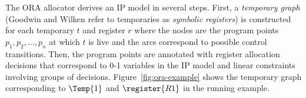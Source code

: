 \documentclass[acmsmall,authorversion,nonacm]{acmart}
\newcommand{\noMathVar}[2]{\operatorname{#1}(#2)}
\begin{document}
The ORA allocator derives an IP model in several steps.
First, a \emph{temporary graph} (Goodwin and Wilken refer to
temporaries as \emph{symbolic registers}) is constructed for each
temporary $t$ and register $r$ where the nodes are the program points
$p_1, p_2, \ldots, p_n$ at which $t$ is live and the arcs correspond
to possible control transitions.
Then, the program points are annotated with register allocation
decisions that correspond to \mbox{0-1} variables in the IP model and
linear constraints involving groups of decisions.
Figure~\ref{fig:ora-example} shows the temporary graph corresponding
to $\Temp{1}$ and $\register{R1}$ in the running example.

\newcommand{\defvar}[1]{\noMathVar{def}{\Temp{1},\register{R1},#1}}
\newcommand{\storevar}[1]{\noMathVar{store}{\Temp{1},\register{R1},#1}}
\newcommand{\contvar}[1]{\noMathVar{cont}{\Temp{1},\register{R1},#1}}
\newcommand{\loadvar}[1]{\noMathVar{load}{\Temp{1},\register{R1},#1}}
\newcommand{\useendvar}[1]{\noMathVar{use-end}{\Temp{1},\register{R1},#1}}
\newcommand{\usecontvar}[1]{\noMathVar{use-cont}{\Temp{1},\register{R1},#1}}
\end{document}
